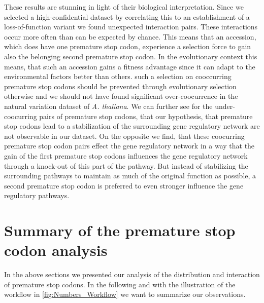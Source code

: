 These results are stunning in light of their biological interpretation. Since we selected a high-confidential dataset by correlating this to an establishment of a loss-of-function variant we found unexpected interaction pairs. These interactions occur more often than can be expected by chance. This means that an accession, which does have one premature stop codon, experience a selection force to gain also the belonging second premature stop codon. In the evolutionary context this means, that such an accession gains a fitness advantage since it can adapt to the environmental factors better than others. such a selection on cooccurring premature stop codons should be prevented through evolutionary selection otherwise and we should not have found significant over-coocurrence in the natural variation dataset of \textit{A. thaliana}. We can further see for the under-coocurring pairs of premature stop codons, that our hypothesis, that premature stop codons lead to a stabilization of the surrounding gene regulatory network are not observable in our dataset. On the opposite we find, that these coocurring premature stop codon pairs effect the gene regulatory network in a way that the gain of the first premature stop codons influences the gene regulatory network through a knock-out of this part of the pathway. But instead of stabilizing the surrounding pathways to maintain as much of the original function as possible, a second premature stop codon is preferred to even stronger influence the gene regulatory pathways.
\section{Summary of the premature stop codon analysis}
In the above sections we presented our analysis of the distribution and interaction of premature stop codons. In the following and with the illustration of the workflow in \autoref{fig:Numbers_Workflow} we want to summarize our observations. 

